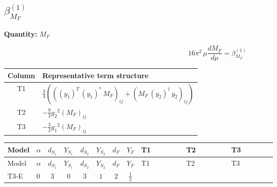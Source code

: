 \documentclass[8pt]{article}
\begin{document}
\begin{landscape}
\section*{$\beta_{M_F}^{(1)}$}
\noindent\textbf{Quantity: }$M_F$\par\smallskip
\[16\pi^2\,\mu\frac{d M_F}{d\mu}=\beta_{M_F}^{(1)}\]
\begin{center}
\begin{tabular}{@{}c >{\raggedright\arraybackslash}p{0.82\linewidth}@{}}
\toprule
Column & Representative term structure \\
\midrule
T1 & \(\displaystyle \frac{3}{4} (\left(\left({y_1}\right)^{T}\,\left({y_1}\right)^{*}\,{M_F}\right)_{ij}+\left({M_F}\,\left({y_2}\right)^{\dagger}\,{y_2}\right)_{ij})\) \\
\midrule
T2 & \(\displaystyle -\frac{9}{2} {g_2}^2 \left({M_F}\right)_{ij}\) \\
\midrule
T3 & \(\displaystyle -\frac{3}{2} {g_1}^2 \left({M_F}\right)_{ij}\) \\
\midrule
\bottomrule
\end{tabular}
\end{center}
\smallskip
\tiny
\begin{longtable}{@{}llcccccc >{\raggedright\arraybackslash}p{0.21\linewidth} >{\raggedright\arraybackslash}p{0.21\linewidth} >{\raggedright\arraybackslash}p{0.21\linewidth}@{}}
\toprule
Model & $\alpha$ & $d_{S_1}$ & $Y_{S_1}$ & $d_{S_2}$ & $Y_{S_2}$ & $d_F$ & $Y_F$ & T1 & T2 & T3 \\
\midrule
\endfirsthead
\toprule
Model & $\alpha$ & $d_{S_1}$ & $Y_{S_1}$ & $d_{S_2}$ & $Y_{S_2}$ & $d_F$ & $Y_F$ & T1 & T2 & T3 \\
\midrule
\endhead
T3-E & $0$ & $3$ & $0$ & $3$ & $1$ & $2$ & $\frac{1}{2}$ & \scriptsize\adjustbox{max width=\linewidth}{$\begin{gathered} \frac{3}{4} (\left(\left({y_1}\right)^{T}\,\left({y_1}\right)^{*}\,{M_F}\right)_{ij}+\left({M_F}\,\left({y_2}\right)^{\dagger}\,{y_2}\right)_{ij})\end{gathered}$} & \scriptsize\adjustbox{max width=\linewidth}{$\begin{gathered} -\frac{9}{2} {g_2}^2 \left({M_F}\right)_{ij}\end{gathered}$} & \scriptsize\adjustbox{max width=\linewidth}{$\begin{gathered} -\frac{3}{2} {g_1}^2 \left({M_F}\right)_{ij}\end{gathered}$} \\
\midrule
\bottomrule
\end{longtable}
\clearpage

\end{landscape}
\end{document}
